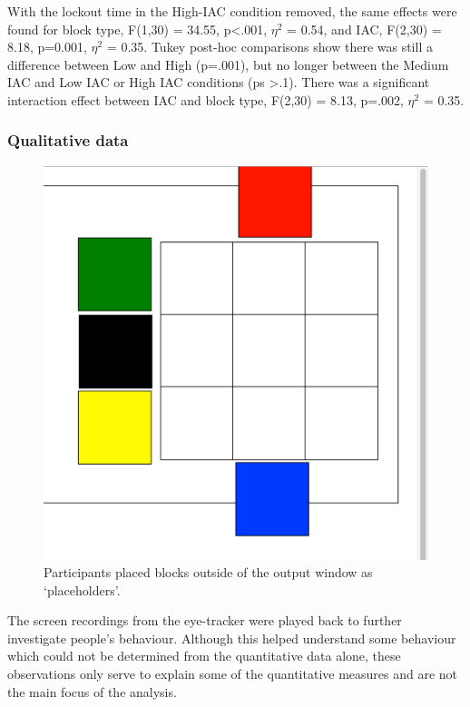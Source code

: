 \documentclass[11pt,oneside]{report}
\begin{document}
\begin{table}
With the lockout time in the High-IAC condition removed, the same effects were found for block type, F(1,30) = 34.55, p<.001, $\eta^2$ = 0.54, and IAC, F(2,30) = 8.18, p=0.001, $\eta^2$ = 0.35. Tukey post-hoc comparisons show there was still a difference between Low and High (p=.001), but no longer between the Medium IAC and Low IAC or High IAC conditions (ps >.1). There was a significant interaction effect between IAC and block type, F(2,30) = 8.13, p=.002, $\eta^2$ = 0.35.

\subsubsection{Qualitative data}
\begin{figure}[!ht]
\centering
\includegraphics[scale=0.3]{images/Study2/ch4_placeholders.pdf}
\caption{Participants placed blocks outside of the output window as `placeholders'.}
\vspace{-9pt}
\label{fig:ch4_placeholders}
\end{figure}
The screen recordings from the eye-tracker were played back to further investigate people's behaviour. Although this helped understand some behaviour which could not be determined from the quantitative data alone, these observations only serve to explain some of the quantitative measures and are not the main focus of the analysis.


\end{table}
\end{document}
